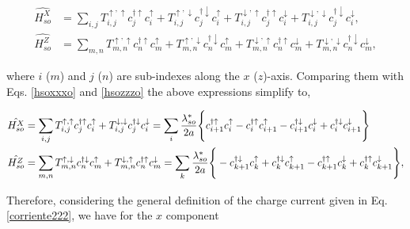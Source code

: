 \documentclass[10pt,prb,showpacs,amssymb,floatfix]{revtex4-1}
\begin{document}
\begin{align}
\label{eqminus1sox}
\hat{H_{so}^X} &=  \sum_{i,j} T_{i,j}^{\uparrow,\uparrow} c_j^{\dagger \uparrow} c_i^\uparrow + T_{i,j}^{\uparrow,\downarrow} c_j^{\dagger \downarrow} c_i^\uparrow + T_{i,j}^{\downarrow,\uparrow} c_j^{\dagger \uparrow} c_i^\downarrow + T_{i,j}^{\downarrow,\downarrow} c_j^{\dagger \downarrow} c_i^\downarrow, \\
\hat{H_{so}^Z} &=  \sum_{m,n} T_{m,n}^{\uparrow,\uparrow} c_n^{\dagger \uparrow} c_m^\uparrow + T_{m,n}^{\uparrow,\downarrow} c_n^{\dagger \downarrow} c_m^\uparrow + T_{m,n}^{\downarrow,\uparrow} c_n^{\dagger \uparrow} c_m^\downarrow + T_{m,n}^{\downarrow,\downarrow} c_n^{\dagger \downarrow} c_m^\downarrow, 
\label{eqminus1soz}
\end{align}

where $i$ ($m$) and $j$ ($n$) are sub-indexes along the $x$ ($z$)-axis. Comparing them with Eqs. \eqref{hsoxxxo} and \eqref{hsozzzo} the above expressions simplify to, 

\begin{align}
\label{eqminus1sox2}
\hat{H_{so}^X} &=  \sum_{i,j} T_{i,j}^{\uparrow,\uparrow} c_j^{\dagger \uparrow} c_i^\uparrow  + T_{i,j}^{\downarrow,\downarrow} c_j^{\dagger \downarrow} c_i^\downarrow = \sum_{i} \frac{\lambda_{so}^*}{2a}  \Bigg{\{} c_{i+1}^{\dagger \uparrow} c_{i}^\uparrow - c_{i}^{\dagger \uparrow} c_{i+1}^\uparrow  - c_{i+1}^{\dagger \downarrow} c_{i}^\downarrow + c_{i}^{\dagger \downarrow} c_{i+1}^\downarrow \Bigg{\}} \\
\hat{H_{so}^Z} &=  \sum_{m,n}  T_{m,n}^{\uparrow,\downarrow} c_n^{\dagger \downarrow} c_m^\uparrow + T_{m,n}^{\downarrow,\uparrow} c_n^{\dagger \uparrow} c_m^\downarrow = \sum_{k}  \frac{\lambda_{so}^*}{2a} \Bigg{\{} -c_{k+1}^{\dagger \downarrow} c_{k}^\uparrow + c_{k}^{\dagger \downarrow} c_{k+1}^\uparrow   - c_{k+1}^{\dagger \uparrow} c_{k}^\downarrow +  c_{k}^{\dagger \uparrow} c_{k+1}^\downarrow \Bigg{\}},
\label{eqminus1soz2}
\end{align}

Therefore, considering the general definition of the charge current given in Eq. \eqref{corriente222}, we have for the $x$ component
\end{document}
